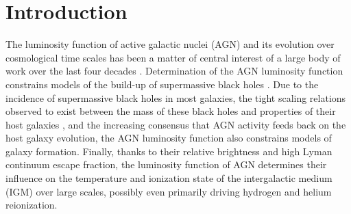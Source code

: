 \documentclass[a4paper,fleqn,usenatbib]{mnras}
\begin{document}
\section{Introduction}

The luminosity function of active galactic nuclei (AGN) and its
evolution over cosmological time scales has been a matter of central
interest of a large body of work over the last four decades
\citep[e.g.,][]{1978A&A....68...17M, 1983ApJ...269..352S,
  1988ApJ...325...92K, 1988MNRAS.235..935B, 1993ApJ...406L..43H,
  1994ApJ...421..412W, 1995AJ....110...68S, 1995AJ....110.2553K,
  1995ApJ...438..623P, 2000MNRAS.317.1014B, 2001AJ....121...54F,
  2004AJ....128..515F, 2006AJ....131.2766R, 2007ApJ...654..731H,
  2009MNRAS.392...19C, 2010AJ....139..906W, 2011ApJ...728L..26G,
  2013ApJ...773...14R, 2013ApJ...768..105M, 2015AA...578A..83G,
  2015ApJ...798...28K, 2016ApJ...829...33Y, 2016ApJ...833..222J,
  2017MNRAS.466.1160M}.  Determination of the AGN luminosity function
constrains models of the build-up of supermassive black holes
\citep{2015MNRAS.452..575S, 2016MNRAS.462..190R}.  Due to the
incidence of supermassive black holes in most galaxies, the tight
scaling relations observed to exist between the mass of these black
holes and properties of their host galaxies
\citep{2013ARA&A..51..511K, 2013ApJ...764..184M}, and the increasing
consensus that AGN activity feeds back on the host galaxy evolution,
the AGN luminosity function also constrains models of galaxy
formation.  Finally, thanks to their relative brightness and high
Lyman continuum escape fraction, the luminosity function of AGN
determines their influence on the temperature and ionization state of
the intergalactic medium (IGM) over large scales, possibly even
primarily driving hydrogen and helium reionization.
\end{document}
